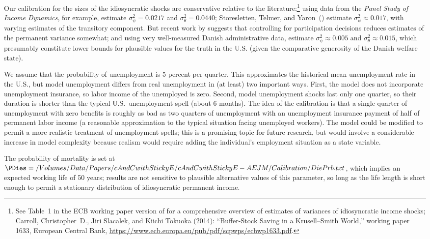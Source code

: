 Our calibration for the sizes of the idiosyncratic shocks are conservative relative to the literature;\footnote{See Table~1 in the ECB working paper version of \cite{cstKS} for a comprehensive overview of estimates of variances of idiosyncratic income shocks; Carroll, Christopher~D., Jiri Slacalek, and Kiichi Tokuoka (2014): ``Buffer-Stock Saving in a Krusell--Smith World,'' working paper 1633, European Central Bank, \url{https://www.ecb.europa.eu/pub/pdf/scpwps/ecbwp1633.pdf}.} using data from the {\it Panel Study of Income Dynamics}, for example, \cite{carroll&samwick:nature} estimate $\sigma_{\psi}^{2} = 0.0217$ and $\sigma_{\theta}^{2} = 0.0440$; Storesletten, Telmer, and Yaron~(\citeyear{sty:consumption}) estimate $\sigma_{\psi}^{2} \approx 0.017$, with varying estimates of the transitory component.  But recent work by \cite{lmpPermShocks} suggests that controlling for participation decisions reduces estimates of the permanent variance somewhat; and using very well-measured Danish administrative data, \cite{nv:risk} estimate $\sigma_{\psi}^{2} \approx 0.005$ and $\sigma_{\theta}^{2} \approx 0.015$, which presumably constitute lower bounds for plausible values for the truth in the U.S. (given the comparative generosity of the Danish welfare state).

We assume that the probability of unemployment is 5 percent per quarter.  This approximates the historical mean unemployment rate in the U.S., but model unemployment differs from real unemployment in (at least) two important ways.  First, the model does not incorporate unemployment insurance, so labor income of the unemployed is zero.  Second, model unemployment shocks last only one quarter, so their duration is shorter than the typical U.S.\ unemployment spell (about 6 months).  The idea of the calibration is that a single quarter of unemployment with zero benefits is roughly as bad as two quarters of unemployment with an unemployment insurance payment of half of permanent labor income (a reasonable approximation to the typical situation facing unemployed workers).  The model could be modified to permit a more realistic treatment of unemployment spells; this is a promising topic for future research, but would involve a considerable increase in model complexity because realism would require adding the individual's employment situation as a state variable.

The probability of mortality is set at $\PDies=  {/Volumes/Data/Papers/cAndCwithStickyE/cAndCwithStickyE-AEJM/Calibration/DiePrb.txt}$, which implies an expected working life of 50 years; results are not sensitive to plausible alternative values of this parameter, so long as the life length is short enough to permit a stationary distribution of idiosyncratic permanent income.